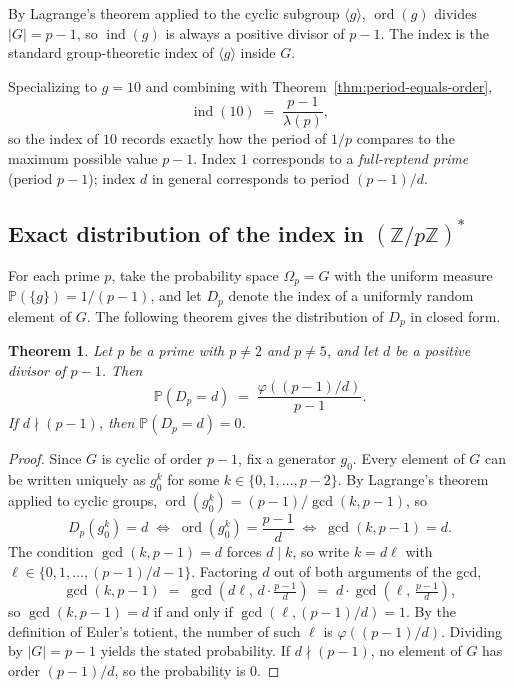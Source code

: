 \documentclass[12pt]{amsart}
\newtheorem{theorem}{Theorem}[section]
\theoremstyle{definition}
\theoremstyle{remark}
\newcommand{\Z}{\mathbb{Z}}
\newcommand{\ord}{\operatorname{ord}}
\newcommand{\ind}{\operatorname{ind}}
\begin{document}
By Lagrange's theorem applied to the cyclic subgroup $\langle g \rangle$,
$\ord(g)$ divides $|G| = p - 1$, so $\ind(g)$ is always a positive divisor
of $p - 1$. The index is the standard group-theoretic index of
$\langle g \rangle$ inside $G$.

Specializing to $g = 10$ and combining with
Theorem~\ref{thm:period-equals-order},
\[
    \ind(10) \;=\; \frac{p - 1}{\lambda(p)},
\]
so the index of $10$ records exactly how the period of $1/p$ compares to
the maximum possible value $p - 1$. Index $1$ corresponds to a
\emph{full-reptend prime} (period $p - 1$); index $d$ in general
corresponds to period $(p - 1)/d$.

\subsection{Exact distribution of the index in $(\Z/p\Z)^*$}
\label{subsec:distribution}

For each prime $p$, take the probability space $\Omega_p = G$ with the
uniform measure $\mathbb{P}(\{g\}) = 1/(p-1)$, and let $D_p$ denote the
index of a uniformly random element of $G$. The following theorem gives
the distribution of $D_p$ in closed form.

\begin{theorem}\label{thm:index-distribution}
Let $p$ be a prime with $p \neq 2$ and $p \neq 5$, and let $d$ be a
positive divisor of $p - 1$. Then
\[
    \mathbb{P}(D_p = d) \;=\; \frac{\varphi\!\left((p-1)/d\right)}{p - 1}.
\]
If $d \nmid (p-1)$, then $\mathbb{P}(D_p = d) = 0$.
\end{theorem}

\begin{proof}
Since $G$ is cyclic of order $p - 1$, fix a generator $g_0$. Every element
of $G$ can be written uniquely as $g_0^k$ for some $k \in \{0, 1, \ldots,
p - 2\}$. By Lagrange's theorem applied to cyclic groups,
$\ord(g_0^k) = (p - 1)/\gcd(k, p - 1)$, so
\[
    D_p(g_0^k) = d
    \;\Longleftrightarrow\;
    \ord(g_0^k) = \frac{p - 1}{d}
    \;\Longleftrightarrow\;
    \gcd(k, p - 1) = d.
\]
The condition $\gcd(k, p - 1) = d$ forces $d \mid k$, so write $k = d\ell$
with $\ell \in \{0, 1, \ldots, (p-1)/d - 1\}$. Factoring $d$ out of both
arguments of the gcd,
\[
    \gcd(k, p - 1) \;=\; \gcd\!\left(d \ell,\, d \cdot \tfrac{p-1}{d}\right)
    \;=\; d \cdot \gcd\!\left(\ell,\, \tfrac{p-1}{d}\right),
\]
so $\gcd(k, p - 1) = d$ if and only if $\gcd(\ell, (p-1)/d) = 1$. By the
definition of Euler's totient, the number of such $\ell$ is
$\varphi((p-1)/d)$. Dividing by $|G| = p - 1$ yields the stated
probability. If $d \nmid (p-1)$, no element of $G$ has order $(p-1)/d$,
so the probability is $0$.
\end{proof}
\end{document}
